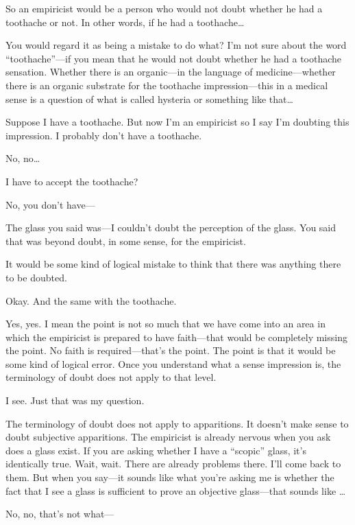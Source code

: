  So an empiricist would be a person who would not doubt 
whether he had a toothache or not. In other words, if he had a 
toothache\ldots

 You would regard it as being a mistake to do what? I'm not 
sure about the word \enquote{toothache}---if you mean that he would not 
doubt whether he had a toothache sensation. Whether there is an 
organic---in the language of medicine---whether there is an organic 
substrate for the toothache impression---this in a medical sense is a 
question of what is called hysteria or something like that\ldots

 Suppose I have a toothache. But now I'm an empiricist so I 
say I'm doubting this impression. I probably don't have a toothache. 

 No, no\ldots

 I have to accept the toothache? 

 No, you don't have--- 

 The glass you said was---I couldn't doubt the perception of 
the glass. You said that was beyond doubt, in some sense, for the 
empiricist. 

 It would be some kind of logical mistake to think that there 
was anything there to be doubted. 

 Okay. And the same with the toothache. 

 Yes, yes. I mean the point is not so much that we have come 
into an area in which the empiricist is prepared to have faith---that 
would be completely missing the point. No faith is required---that's the 
point. The point is that it would be some kind of logical error. Once you 
understand what a sense impression is, the terminology of doubt does 
not apply to that level. 

 I see. Just that was my question. 

 The terminology of doubt does not apply to apparitions. It 
doesn't make sense to doubt subjective apparitions. The empiricist is 
already nervous when you ask does a glass exist. If you are asking 
whether I have a \enquote{scopic} glass, it's identically true. Wait, wait. There 
are already problems there. I'll come back to them. But when you 
say---it sounds like what you're asking me is whether the fact that I see a 
glass is sufficient to prove an objective glass---that sounds like \ldots

 No, no, that's not what---

